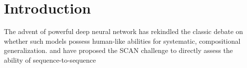 \section{Introduction}
The advent of powerful deep neural network has rekindled the classic
debate on whether such models possess human-like abilities for
systematic, compositional generalization. \citet{Lake:Baroni:2017} and
\citet{Loula:etal:2018} have proposed the SCAN challenge to directly assess the ability of sequence-to-sequence 


